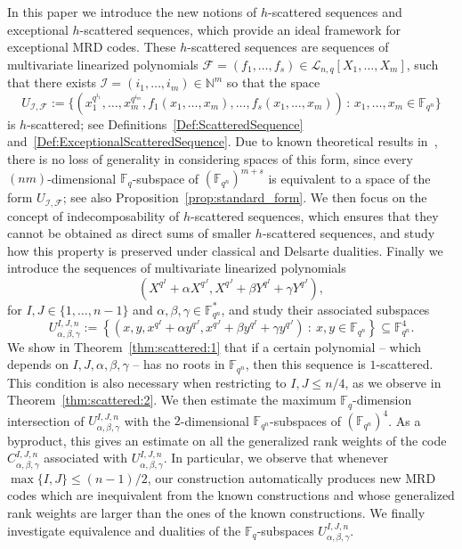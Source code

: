 \documentclass[11pt]{article}
\theoremstyle{definition}
\numberwithin{equation}{section}
\begin{document}
In this paper we introduce the new notions of $h$-scattered sequences and exceptional $h$-scattered sequences, which provide an ideal framework for exceptional MRD codes. These $h$-scattered sequences are sequences of multivariate linearized polynomials $\mathcal F=(f_1,\ldots, f_s)\in \mathcal{L}_{n,q}[X_1,\ldots,X_m]$, such that there exists 
$\mathcal I=(i_1,\ldots, i_m) \in \mathbb{N}^m$ so that the space 
$$ U_{\mathcal I,\mathcal F}:=\{ (x_1^{q^{i_1}}, \ldots,x_m^{q^{i_m}},f_1(x_1,\ldots,x_m), \ldots,f_s(x_1,\ldots,x_m) ) \, : \, x_1,\ldots,x_m \in {\mathbb F}_{q^n}\}$$
is $h$-scattered; see Definitions~\ref{Def:ScatteredSequence} and~\ref{Def:ExceptionalScatteredSequence}. Due to known theoretical results in~\cite{alfarano2023critical,polverino2010linear}, there is no loss of generality in considering spaces of this form, since every $(nm)$-dimensional $\mathbb{F}_q$-subspace of $(\mathbb{F}_{q^n})^{m+s}$ is equivalent to a space of the form $U_{\mathcal I,\mathcal F}$; see also Proposition~\ref{prop:standard_form}. 
We then focus on the concept of indecomposability of $h$-scattered sequences, which ensures that they cannot be obtained as direct sums of smaller $h$-scattered sequences, and study how this property is preserved under classical and Delsarte dualities.  
Finally we introduce  the sequences of multivariate linearized polynomials 
$$  (X^{q^I}+\alpha X^{q^J}, X^{q^J}+\beta Y^{q^I}+\gamma Y^{q^J}),$$
for $I,J\in\{1,\ldots,n-1\}$ and $\alpha, \beta,\gamma\in {\mathbb F}_{q^n}^*$, and study their associated subspaces 
$$    U_{\alpha, \beta, \gamma}^{I,J,n}:=\left\{\left(x,y,x^{q^I}+\alpha y^{q^J},x^{q^J}+\beta y^{q^I} + \gamma y^{q^J}\right) \ : \ x,y\in \mathbb{F}_{q^n}\right\}\subseteq {\mathbb F}_{q^n}^4.$$
We show in Theorem~\ref{thm:scattered:1} that if a certain polynomial -- which depends on $I,J,\alpha,\beta,\gamma$ -- has no roots in ${\mathbb F}_{q^n}$, then this sequence is $1$-scattered.  This condition is also necessary when restricting to $I,J\leq n/4$, as we observe in Theorem~\ref{thm:scattered:2}. 
We then estimate the maximum $\mathbb{F}_q$-dimension intersection of $U_{\alpha, \beta, \gamma}^{I,J,n}$ with the $2$-dimensional ${\mathbb F}_{q^n}$-subspaces of $(\mathbb{F}_{q^n})^4$. As a byproduct, this gives an estimate on all the generalized rank weights of the code $C_{\alpha, \beta, \gamma}^{I,J,n}$ associated with $U_{\alpha, \beta, \gamma}^{I,J,n}$. In particular, we observe that whenever $\max\{I,J\}\leq (n-1)/2$, our construction automatically produces new MRD codes which are inequivalent from the known constructions and whose generalized rank weights are larger than the ones of the known constructions. We finally investigate equivalence and dualities of the $\mathbb{F}_q$-subspaces $U_{\alpha, \beta, \gamma}^{I,J,n}$.
\end{document}
